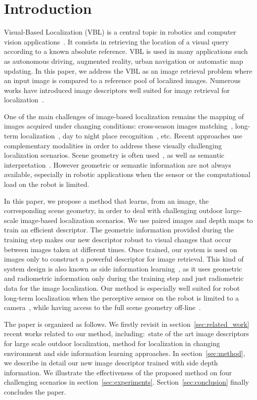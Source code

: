 \section{Introduction}
\label{sec:intro}

Visual-Based Localization (VBL) is a central topic in robotics and computer vision applications~\cite{Piasco2017}. It consists in retrieving the location of a visual query according to a known absolute reference. VBL is used in many applications such as autonomous driving, augmented reality, urban navigation or automatic map updating. In this paper, we address the VBL as an image retrieval problem where an input image is compared to a reference pool of localized images. Numerous works have introduced image descriptors well suited for image retrieval for localization~\cite{Arandjelovic2017,Kim2017a,Gordo2017,Radenovic2017,Liu2018}. 

One of the main challenges of image-based localization remains the mapping of images acquired under changing conditions: cross-season images matching~\cite{Naseer2017a}, long-term localization~\cite{Toft2018}, day to night place recognition~\cite{Torii2015}, etc. Recent approaches use complementary modalities in order to address these visually challenging localization scenarios. Scene geometry is often used~\cite{Cavallari?,Schonberger2018}, as well as semantic interpretation~\cite{Ardeshir2014,Christie2016,Naseer2017a}. However geometric or semantic information are not always available, especially in robotic applications when the sensor or the computational load on the robot is limited.

In this paper, we propose a method that learns, from an image, the corresponding scene geometry, in order to deal with challenging outdoor large-scale image-based localization scenarios. We use paired images and depth maps to train an efficient descriptor. The geometric information provided during the training step makes our new descriptor robust to visual changes that occur between images taken at different times. Once trained, our system is used on images only to construct a powerful descriptor for image retrieval. This kind of system design is also known as side information learning~\cite{Hoffman2016}, as it uses geometric and radiometric information only during the training step and just radiometric data for the image localization. Our method is especially well suited for robot long-term localization when the perceptive sensor on the robot is limited to a camera~\cite{Middelberg2014}, while having access to the full scene geometry off-line~\cite{Paparoditis2012,Maddern2016,Wang2016}. 

The paper is organized as follows. We firstly revisit in section~\ref{sec:related_work} recent works related to our method, including:~state of the art image descriptors for large scale outdoor localization, method for localization in changing environment and side information learning approaches. In section~\ref{sec:method}, we describe in detail our new image descriptor trained with side depth information. We illustrate the effectiveness of the proposed method on four challenging scenarios in section~\ref{sec:experiments}. Section~\ref{sec:conclusion} finally concludes the paper.